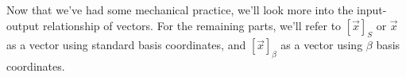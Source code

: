 \begin{enumerate}

 \end{enumerate}

 Now that we've had some mechanical practice, we'll look more into the input-output relationship of vectors.
 For the remaining parts, we'll refer to $[\vec{x}]_S$ or $\vec{x}$ as a vector using standard basis coordinates, and $[\vec{x}]_\beta$ as a vector using $\beta$ basis coordinates.


